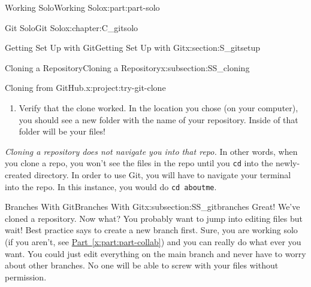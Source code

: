 \documentclass[oneside,10pt,]{book}
\newcommand{\xreffont}{\relax}
\newcommand{\mono}[1]{\texttt{#1}}
\newcommand{\acronym}[1]{\textsc{\MakeLowercase{#1}}}
\begin{document}
\begin{partptx}{Working Solo}{}{Working Solo}{}{}{x:part:part-solo}
\begin{chapterptx}{Git Solo}{}{Git Solo}{}{}{x:chapter:C_gitsolo}
\begin{sectionptx}{Getting Set Up with Git}{}{Getting Set Up with Git}{}{}{x:section:S_gitsetup}
\begin{subsectionptx}{Cloning a Repository}{}{Cloning a Repository}{}{}{x:subsection:SS_cloning}
\begin{project}{Cloning from GitHub.}{x:project:try-git-clone}
\begin{enumerate}[font=\bfseries,label=(\alph*),ref=\alph*]
\begin{console}{0}{1}{0}
Receiving objects: 100%
Resolving deltas: 100%
\end{console}
where \textless{}copied-https-string\textgreater{} is replaced with the HTTPS string you copied in \hyperref[x:task:clone-https]{Task~{\xreffont\ref{x:project:try-git-clone}}.{\xreffont\ref{x:task:clone-https}}}. Press enter to run the command.%
\par
Your terminal may ask you for your GitHub username and password. This is ok: enter your username and instead of typing your normal GitHub password, paste\slash{}type your \acronym{PAT} as found in \hyperref[x:project:gitproc-pat]{Git Procedure~{\xreffont\ref{x:project:gitproc-pat}}}.%
\item{}Verify that the clone worked. In the location you chose (on your computer), you should see a new folder with the name of your repository. Inside of that folder will be your files!%
\end{enumerate}
\end{project}%
\emph{Cloning a repository does not navigate you into that repo.} In other words, when you clone a repo, you won't see the files in the repo until you \mono{cd} into the newly-created directory. In order to use Git, you will have to navigate your terminal into the repo. In this instance, you would do \mono{cd aboutme}.%
\end{subsectionptx}
%
%
\typeout{************************************************}
\typeout{************************************************}
%
\begin{subsectionptx}{Branches With Git}{}{Branches With Git}{}{}{x:subsection:SS_gitbranches}
%
%
Great! We've cloned a repository. Now what? You probably want to jump into editing files but wait! Best practice says to create a new branch first. Sure, you are working solo (if you aren't, see \hyperref[x:part:part-collab]{Part~{\xreffont\ref{x:part:part-collab}}}) and you can really do what ever you want. You could just edit everything on the main branch and never have to worry about other branches. No one will be able to screw with your files without permission.%
\par

\end{subsectionptx}
\end{sectionptx}
\end{chapterptx}
\end{partptx}
\end{document}
